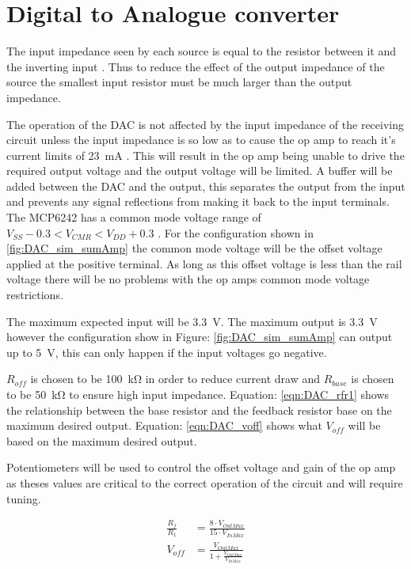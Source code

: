 \clearpage
\section{Digital to Analogue converter}
The input impedance seen by each source is equal to the resistor between it and the inverting input \cite{Lit_SumAmp_ET}. Thus to reduce the effect of the output impedance of the source the smallest input resistor must be much larger than the output impedance.

The operation of the DAC is not affected by the input impedance of the receiving circuit unless the input impedance is so low as to cause the op amp to reach it's current limits of \SI{23}{\milli\ampere} \cite{Data_MCP}. This will result in the op amp being unable to drive the required output voltage and the output voltage will be limited. A buffer will be added between the DAC and the output, this separates the output from the input and prevents any signal reflections from making it back to the input terminals.
\medskip\\
The MCP6242 has a common mode voltage range of $V_{SS} -0.3 < V_{CMR} < V_{DD} +0.3$ \cite{Data_MCP}. For the configuration shown in \ref{fig:DAC_sim_sumAmp} the common mode voltage will be the offset voltage applied at the positive terminal. As long as this offset voltage is less than the rail voltage there will be no problems with the op amps common mode voltage restrictions.

The maximum expected input will be \SI{3.3}{\volt}. The maximum output is \SI{3.3}{\volt} however the configuration show in Figure: \ref{fig:DAC_sim_sumAmp} can output up to \SI{5}{\volt}, this can only happen if the input voltages go negative.

$R_{off}$ is chosen to be \SI{100}{\kilo\ohm} in order to reduce current draw and $R_{base}$ is chosen to be \SI{50}{\kilo\ohm} to ensure high input impedance. Equation: \ref{eqn:DAC_rfr1} shows the relationship between the base resistor and the feedback resistor base on the maximum desired output. Equation: \ref{eqn:DAC_voff} shows what $V_{off}$ will be based on the maximum desired output. 

Potentiometers will be used to control the offset voltage and gain of the op amp as theses values are critical to the correct operation of the circuit and will require tuning.

\begin{align}
\frac{R_f}{R_1} &= \frac{8 \cdot V_{OutMax}}{15 \cdot V_{InMax}}\label{eqn:DAC_rfr1}\\
V_{off} &= \frac{V_{OutMax}}{1+\frac{V_{OutMax}}{V_{InMax}}}\label{eqn:DAC_voff}
\end{align}

